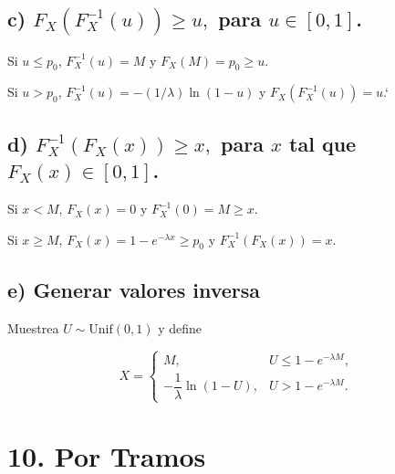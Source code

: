 \documentclass[10pt,a4paper]{article}
\begin{document}
    \begin{center}
    \end{center}
    { \hspace*{\fill} \\}
    
    \hypertarget{c-f_xf-1_xu-geq-u-para-u-in-0-1.}{%
\subsection{\texorpdfstring{c) \(F_X(F^{-1}_X(u)) \geq u,\) para
\(u \in [0, 1]\).}{c) F\_X(F\^{}\{-1\}\_X(u)) \textbackslash geq u, para u \textbackslash in {[}0, 1{]}.}}\label{c-f_xf-1_xu-geq-u-para-u-in-0-1.}}

    Si \(u\leq p_0\), \(F_X^{-1}(u)=M\) y \(F_X(M)=p_0\geq u\).

Si \(u>p_0\), \(F_X^{-1}(u)=-(1/\lambda)\ln(1-u)\) y
\(F_X(F_X^{-1}(u))=u\).`

    \hypertarget{d-f-1_xf_xx-geq-x-para-x-tal-que-f_xx-in-0-1.}{%
\subsection{\texorpdfstring{d) \(F^{-1}_X(F_X(x)) \geq x,\) para \(x\)
tal que
\(F_X(x) \in [0, 1]\).}{d) F\^{}\{-1\}\_X(F\_X(x)) \textbackslash geq x, para x tal que F\_X(x) \textbackslash in {[}0, 1{]}.}}\label{d-f-1_xf_xx-geq-x-para-x-tal-que-f_xx-in-0-1.}}

    Si \(x<M\), \(F_X(x)=0\) y \(F_X^{-1}(0)=M\geq x\).

Si \(x\geq M\), \(F_X(x)=1-e^{-\lambda x}\geq p_0\) y
\(F_X^{-1}(F_X(x))=x\).

    \hypertarget{e-cuxf3mo-generar-valores-con-el-muxe9todo-de-la-funciuxf3n-inversa}{%
\subsection{e) Generar valores
inversa}\label{e-cuxf3mo-generar-valores-con-el-muxe9todo-de-la-funciuxf3n-inversa}}

    Muestrea \(U\sim\mathrm{Unif}(0,1)\) y define

\[
X=\begin{cases}
M,& U\leq 1-e^{-\lambda M},\\[6pt]
-\dfrac{1}{\lambda}\ln(1-U),& U>1-e^{-\lambda M}.
\end{cases}
\]


    \hypertarget{variable-con-cdf-por-tramos}{%
\section{10. Por Tramos}\label{variable-con-cdf-por-tramos}}
\end{document}
